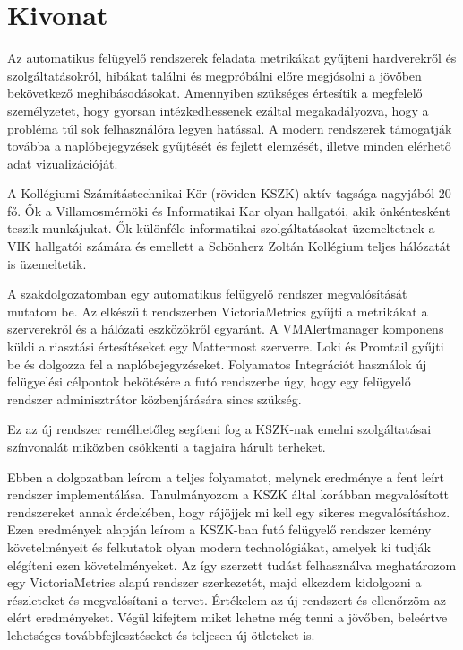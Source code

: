 \setcounter{page}{1}

\selecthungarian

\chapter*{Kivonat}

Az automatikus felügyelő rendszerek feladata metrikákat gyűjteni hardverekről
és szolgáltatásokról, hibákat találni és megpróbálni előre megjósolni a jövőben
bekövetkező meghibásodásokat. Amennyiben szükséges értesítik a megfelelő
személyzetet, hogy gyorsan intézkedhessenek ezáltal megakadályozva, hogy a
probléma túl sok felhasználóra legyen hatással. A modern rendszerek támogatják
továbba a naplóbejegyzések gyűjtését és fejlett elemzését, illetve minden
elérhető adat vizualizációját.

A Kollégiumi Számítástechnikai Kör (röviden KSZK) aktív tagsága nagyjából 20
fő. Ők a Villamosmérnöki és Informatikai Kar olyan hallgatói, akik önkéntesként
teszik munkájukat. Ők különféle informatikai szolgáltatásokat üzemeltetnek a
VIK hallgatói számára és emellett a Schönherz Zoltán Kollégium teljes hálózatát
is üzemeltetik.

A szakdolgozatomban egy automatikus felügyelő rendszer megvalósítását mutatom
be. Az elkészült rendszerben VictoriaMetrics gyűjti a metrikákat a szerverekről
és a hálózati eszközökről egyaránt. A VMAlertmanager komponens küldi a
riasztási értesítéseket egy Mattermost szerverre. Loki és Promtail gyűjti be és
dolgozza fel a naplóbejegyzéseket. Folyamatos Integrációt használok új
felügyelési célpontok bekötésére a futó rendszerbe úgy, hogy egy felügyelő
rendszer adminisztrátor közbenjárására sincs szükség.

Ez az új rendszer remélhetőleg segíteni fog a KSZK-nak emelni szolgáltatásai
színvonalát miközben csökkenti a tagjaira hárult terheket.

Ebben a dolgozatban leírom a teljes folyamatot, melynek eredménye a fent leírt
rendszer implementálása. Tanulmányozom a KSZK által korábban megvalósított
rendszereket annak érdekében, hogy rájöjjek mi kell egy sikeres
megvalósításhoz. Ezen eredmények alapján leírom a KSZK-ban futó felügyelő
rendszer kemény követelményeit és felkutatok olyan modern technológiákat,
amelyek ki tudják elégíteni ezen követelményeket. Az így szerzett tudást
felhasználva meghatározom egy VictoriaMetrics alapú rendszer szerkezetét, majd
elkezdem kidolgozni a részleteket és megvalósítani a tervet. Értékelem az új
rendszert és ellenőrzöm az elért eredményeket. Végül kifejtem miket lehetne még
tenni a jövőben, beleértve lehetséges továbbfejlesztéseket és teljesen új
ötleteket is.


